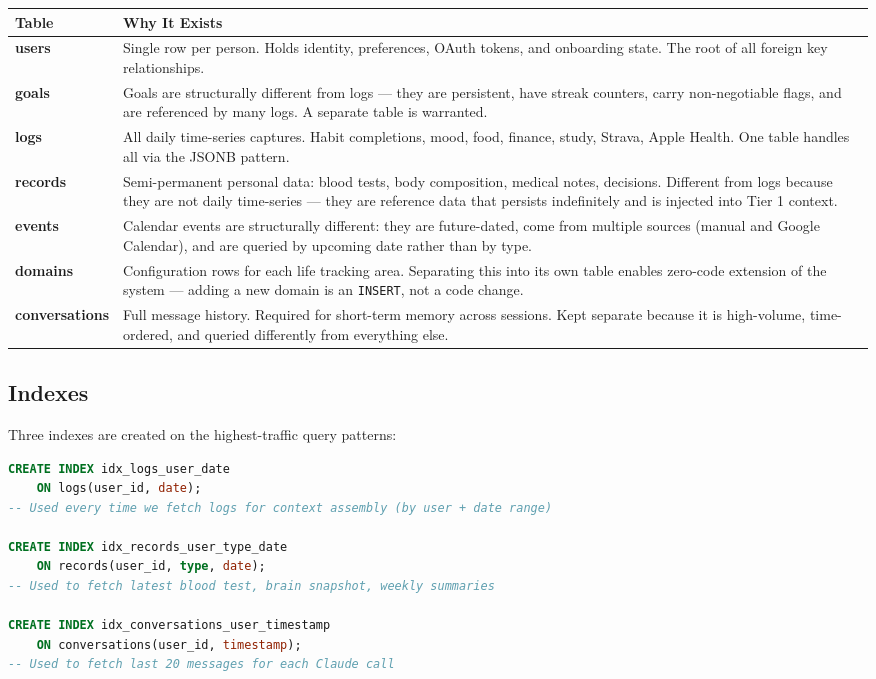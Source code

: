\documentclass[12pt, a4paper]{article}
\begin{document}
\begin{longtable}{>{\bfseries}p{3cm} p{11cm}}
\toprule
Table & Why It Exists \\
\midrule
users & Single row per person. Holds identity, preferences, OAuth tokens, and onboarding state. The root of all foreign key relationships. \\
\addlinespace
goals & Goals are structurally different from logs --- they are persistent, have streak counters, carry non-negotiable flags, and are referenced by many logs. A separate table is warranted. \\
\addlinespace
logs & All daily time-series captures. Habit completions, mood, food, finance, study, Strava, Apple Health. One table handles all via the JSONB pattern. \\
\addlinespace
records & Semi-permanent personal data: blood tests, body composition, medical notes, decisions. Different from logs because they are not daily time-series --- they are reference data that persists indefinitely and is injected into Tier 1 context. \\
\addlinespace
events & Calendar events are structurally different: they are future-dated, come from multiple sources (manual and Google Calendar), and are queried by upcoming date rather than by type. \\
\addlinespace
domains & Configuration rows for each life tracking area. Separating this into its own table enables zero-code extension of the system --- adding a new domain is an \texttt{INSERT}, not a code change. \\
\addlinespace
conversations & Full message history. Required for short-term memory across sessions. Kept separate because it is high-volume, time-ordered, and queried differently from everything else. \\
\bottomrule
\end{longtable}

\subsection{Indexes}

Three indexes are created on the highest-traffic query patterns:

\begin{lstlisting}[language=SQL]
CREATE INDEX idx_logs_user_date
    ON logs(user_id, date);
-- Used every time we fetch logs for context assembly (by user + date range)

CREATE INDEX idx_records_user_type_date
    ON records(user_id, type, date);
-- Used to fetch latest blood test, brain snapshot, weekly summaries

CREATE INDEX idx_conversations_user_timestamp
    ON conversations(user_id, timestamp);
-- Used to fetch last 20 messages for each Claude call
\end{lstlisting}
\end{document}
